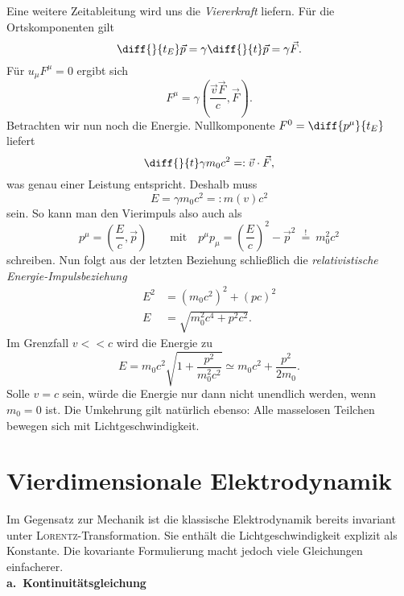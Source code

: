 Eine weitere Zeitableitung wird uns die \emph{Viererkraft} liefern. Für die Ortskomponenten gilt
\begin{equation*}
\diff{}{t_E}\vec{p}=\gamma\diff{}{t}\vec{p}=\gamma\vec{F}.
\end{equation*}
Für $u_\mu F^\mu =0$ ergibt sich
\begin{equation*}
F^\mu = \gamma\left(\frac{\vec{v}\vec{F}}{c},\vec{F}\right).
\end{equation*}
Betrachten wir nun noch die Energie. Nullkomponente $F^0 = \diff{p^\mu}{t_E}$ liefert
\begin{equation*}
\diff{}{t}\gamma m_0c^2 =:\vec{v}\cdot\vec{F},
\end{equation*}
was genau einer Leistung entspricht. Deshalb muss 
\begin{equation*}
E = \gamma m_0 c^2 =: m(v)c^2
\end{equation*}
sein. So kann man den Vierimpuls also auch als
\begin{equation*}
p^\mu =\left(\frac{E}{c},\vec{p}\right)\qquad\text{mit}\quad p^\mu p_\mu = \left(\frac{E}{c}\right)^2 - \vec{p}^2 \ \stackrel{!}{=}\ m_0^2c^2
\end{equation*}
schreiben. Nun folgt aus der letzten Beziehung schließlich die \emph{relativistische Energie-Impulsbeziehung}
\begin{align*}
E^2 &= \left(m_0c^2\right)^2 + \left(p c\right)^2\\
E &= \sqrt{m_0^2c^4 + p^2c^2}.
\end{align*}
Im Grenzfall $v<<c$ wird die Energie zu
\begin{equation*}
E = m_0c^2\sqrt{1+\frac{p^2}{m_0^2c^2}} \simeq m_0c^2 + \frac{p^2}{2m_0}.
\end{equation*}
Solle $v=c$ sein, würde die Energie nur dann nicht unendlich werden, wenn $m_0=0$ ist. Die Umkehrung gilt natürlich ebenso: Alle masselosen Teilchen bewegen sich mit Lichtgeschwindigkeit.

\section{Vierdimensionale Elektrodynamik}

Im Gegensatz zur Mechanik ist die klassische Elektrodynamik bereits invariant unter \textsc{Lorentz}-Transformation. Sie enthält die Lichtgeschwindigkeit explizit als Konstante. Die kovariante Formulierung macht jedoch viele Gleichungen einfacherer.\\

\textbf{a.\ Kontinuitätsgleichung}\\ 

